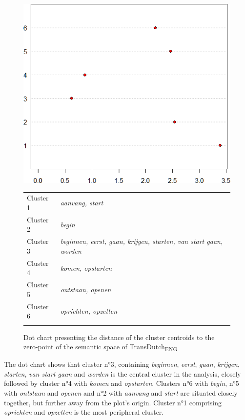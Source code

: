 \begin{figure} 
\includegraphics[height=.4\textheight]{figures/Vandevoorde2-img68.png}
\scriptsize
\begin{tabular}{l>{\itshape}l}
\lsptoprule
Cluster 1 & aanvang{\normalfont,} start\\
Cluster 2 & begin\\
Cluster 3 & beginnen{\normalfont,} eerst{\normalfont,} gaan{\normalfont,} krijgen{\normalfont,} starten{\normalfont,} van start gaan{\normalfont,} worden\\
Cluster 4 & komen{\normalfont,} opstarten\\
Cluster 5 & ontstaan{\normalfont,} openen\\
Cluster 6 & oprichten{\normalfont,} opzetten\\
\lspbottomrule
\end{tabular}
\normalsize
\caption{\label{fig:4:kmeansdutch6}Dot chart presenting the distance of the cluster centroids to the zero-point of the semantic space of TransDutch\textsubscript{ENG}}
\end{figure}

The dot chart shows that cluster n°3, containing \textit{beginnen}, \textit{eerst}, \textit{gaan}, \textit{krijgen}, \textit{starten}, \textit{van start gaan} and \textit{worden} is the central cluster in the analysis, closely followed by cluster n°4 with \textit{komen} and \textit{opstarten}. Clusters n°6 with \textit{begin}, n°5 with \textit{ontstaan} and \textit{openen} and n°2 with \textit{aanvang} and \textit{start} are situated closely together, but further away from the plot’s origin. Cluster n°1 comprising \textit{oprichten} and \textit{opzetten} is the most peripheral cluster.


